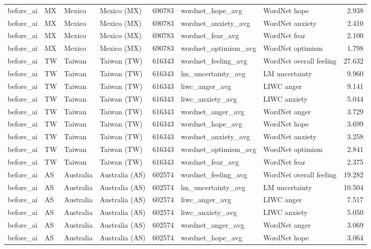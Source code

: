 \begin{tabular}{llllrllr}
before\_ai & MX & Mexico & Mexico (MX) & 690783 & wordnet\_hope\_avg & WordNet hope & 2.938 \\
before\_ai & MX & Mexico & Mexico (MX) & 690783 & wordnet\_anxiety\_avg & WordNet anxiety & 2.410 \\
before\_ai & MX & Mexico & Mexico (MX) & 690783 & wordnet\_fear\_avg & WordNet fear & 2.100 \\
before\_ai & MX & Mexico & Mexico (MX) & 690783 & wordnet\_optimism\_avg & WordNet optimism & 1.798 \\
before\_ai & TW & Taiwan & Taiwan (TW) & 616343 & wordnet\_feeling\_avg & WordNet overall feeling & 27.632 \\
before\_ai & TW & Taiwan & Taiwan (TW) & 616343 & lm\_uncertainty\_avg & LM uncertainty & 9.960 \\
before\_ai & TW & Taiwan & Taiwan (TW) & 616343 & liwc\_anger\_avg & LIWC anger & 9.141 \\
before\_ai & TW & Taiwan & Taiwan (TW) & 616343 & liwc\_anxiety\_avg & LIWC anxiety & 5.044 \\
before\_ai & TW & Taiwan & Taiwan (TW) & 616343 & wordnet\_anger\_avg & WordNet anger & 3.729 \\
before\_ai & TW & Taiwan & Taiwan (TW) & 616343 & wordnet\_hope\_avg & WordNet hope & 3.699 \\
before\_ai & TW & Taiwan & Taiwan (TW) & 616343 & wordnet\_anxiety\_avg & WordNet anxiety & 3.258 \\
before\_ai & TW & Taiwan & Taiwan (TW) & 616343 & wordnet\_optimism\_avg & WordNet optimism & 2.841 \\
before\_ai & TW & Taiwan & Taiwan (TW) & 616343 & wordnet\_fear\_avg & WordNet fear & 2.375 \\
before\_ai & AS & Australia & Australia (AS) & 602574 & wordnet\_feeling\_avg & WordNet overall feeling & 19.282 \\
before\_ai & AS & Australia & Australia (AS) & 602574 & lm\_uncertainty\_avg & LM uncertainty & 10.504 \\
before\_ai & AS & Australia & Australia (AS) & 602574 & liwc\_anger\_avg & LIWC anger & 7.517 \\
before\_ai & AS & Australia & Australia (AS) & 602574 & liwc\_anxiety\_avg & LIWC anxiety & 5.050 \\
before\_ai & AS & Australia & Australia (AS) & 602574 & wordnet\_anger\_avg & WordNet anger & 3.069 \\
before\_ai & AS & Australia & Australia (AS) & 602574 & wordnet\_hope\_avg & WordNet hope & 3.064 \\

\end{tabular}
